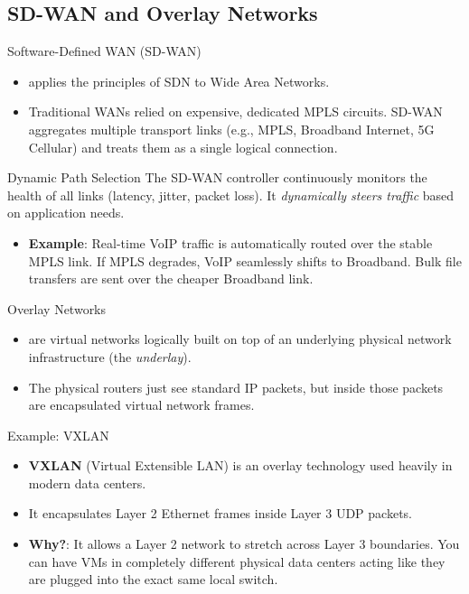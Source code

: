 \documentclass[aspectratio=169]{beamer}  %
\begin{document}
\subsection{SD-WAN and Overlay Networks}
\begin{frame}[t]{Software-Defined WAN (SD-WAN)}
    \begin{itemize}
        \item {} applies the principles of SDN to Wide Area Networks.
        \item Traditional WANs relied on expensive, dedicated MPLS circuits. SD-WAN aggregates multiple transport links (e.g., MPLS, Broadband Internet, 5G Cellular) and treats them as a single logical connection.
    \end{itemize}
    \vspace{0.3em}
    \begin{block}{Dynamic Path Selection}
        \footnotesize
        The SD-WAN controller continuously monitors the health of all links (latency, jitter, packet loss). It \textit{dynamically steers traffic} based on application needs.
        \begin{itemize}
            \item \textbf{Example}: Real-time VoIP traffic is automatically routed over the stable MPLS link. If MPLS degrades, VoIP seamlessly shifts to Broadband. Bulk file transfers are sent over the cheaper Broadband link.
        \end{itemize}
    \end{block}
\end{frame}

\begin{frame}[t]{Overlay Networks}
    \begin{itemize}
        \item {} are virtual networks logically built on top of an underlying physical network infrastructure (the \textit{underlay}).
        \item The physical routers just see standard IP packets, but inside those packets are encapsulated virtual network frames.
    \end{itemize}
    \vspace{0.3em}
    \begin{block}{Example: VXLAN}
        \footnotesize
        \begin{itemize}
            \item \textbf{VXLAN} (Virtual Extensible LAN) is an overlay technology used heavily in modern data centers.
            \item It encapsulates Layer 2 Ethernet frames inside Layer 3 UDP packets.
            \item \textbf{Why?}: It allows a Layer 2 network to stretch across Layer 3 boundaries. You can have VMs in completely different physical data centers acting like they are plugged into the exact same local switch.
        \end{itemize}
    \end{block}
\end{frame}
\end{document}
